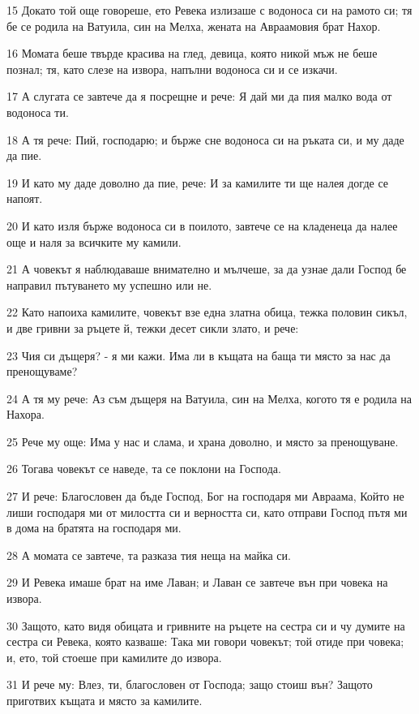 \par 15 Докато той още говореше, ето Ревека излизаше с водоноса си на рамото си; тя бе се родила на Ватуила, син на Мелха, жената на Авраамовия брат Нахор.
\par 16 Момата беше твърде красива на глед, девица, която никой мъж не беше познал; тя, като слезе на извора, напълни водоноса си и се изкачи.
\par 17 А слугата се завтече да я посрещне и рече: Я дай ми да пия малко вода от водоноса ти.
\par 18 А тя рече: Пий, господарю; и бърже сне водоноса си на ръката си, и му даде да пие.
\par 19 И като му даде доволно да пие, рече: И за камилите ти ще налея догде се напоят.
\par 20 И като изля бърже водоноса си в поилото, завтече се на кладенеца да налее още и наля за всичките му камили.
\par 21 А човекът я наблюдаваше внимателно и мълчеше, за да узнае дали Господ бе направил пътуването му успешно или не.
\par 22 Като напоиха камилите, човекът взе една златна обица, тежка половин сикъл, и две гривни за ръцете й, тежки десет сикли злато, и рече:
\par 23 Чия си дъщеря? - я ми кажи. Има ли в къщата на баща ти място за нас да пренощуваме?
\par 24 А тя му рече: Аз съм дъщеря на Ватуила, син на Мелха, когото тя е родила на Нахора.
\par 25 Рече му още: Има у нас и слама, и храна доволно, и място за пренощуване.
\par 26 Тогава човекът се наведе, та се поклони на Господа.
\par 27 И рече: Благословен да бъде Господ, Бог на господаря ми Авраама, Който не лиши господаря ми от милостта си и верността си, като отправи Господ пътя ми в дома на братята на господаря ми.
\par 28 А момата се завтече, та разказа тия неща на майка си.
\par 29 И Ревека имаше брат на име Лаван; и Лаван се завтече вън при човека на извора.
\par 30 Защото, като видя обицата и гривните на ръцете на сестра си и чу думите на сестра си Ревека, която казваше: Така ми говори човекът; той отиде при човека; и, ето, той стоеше при камилите до извора.
\par 31 И рече му: Влез, ти, благословен от Господа; защо стоиш вън? Защото приготвих къщата и място за камилите.
